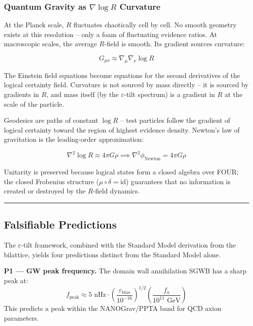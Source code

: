 \hypertarget{quantum-gravity-as-nabla-log-r-curvature}{%
\subsubsection{\texorpdfstring{Quantum Gravity as \(\nabla \log R\)
Curvature}{Quantum Gravity as \textbackslash nabla \textbackslash log R Curvature}}\label{quantum-gravity-as-nabla-log-r-curvature}}

At the Planck scale, \(R\) fluctuates chaotically cell by cell. No
smooth geometry exists at this resolution -- only a foam of fluctuating
evidence ratios. At macroscopic scales, the average \(R\)-field is
smooth. Its gradient sources curvature:

\[G_{\mu\nu} \approx \nabla_\mu \nabla_\nu \log R\]

The Einstein field equations become equations for the second derivatives
of the logical certainty field. Curvature is not sourced by mass
directly -- it is sourced by gradients in \(R\), and mass itself (by the
\(\varepsilon\)-tilt spectrum) is a gradient in \(R\) at the scale of
the particle.

Geodesics are paths of constant \(\log R\) -- test particles follow the
gradient of logical certainty toward the region of highest evidence
density. Newton's law of gravitation is the leading-order approximation:

\[\nabla^2 \log R \approx 4\pi G \rho \implies \nabla^2 \phi_\text{Newton} = 4\pi G \rho\]

Unitarity is preserved because logical states form a closed algebra over
FOUR; the closed Frobenius structure
(\(\mu \circ \delta = \mathrm{id}\)) guarantees that no information is
created or destroyed by the \(R\)-field dynamics.

\begin{center}\rule{0.5\linewidth}{0.5pt}\end{center}

\hypertarget{falsifiable-predictions}{%
\subsection{Falsifiable Predictions}\label{falsifiable-predictions}}

The \(\varepsilon\)-tilt framework, combined with the Standard Model
derivation from the bilattice, yields four predictions distinct from the
Standard Model alone.

\textbf{P1 --- GW peak frequency.} The domain wall annihilation SGWB has
a sharp peak at:
\[f_\text{peak} \approx 5 \text{ nHz} \cdot \left(\frac{\varepsilon_\text{bias}}{10^{-16}}\right)^{1/2} \left(\frac{f_a}{10^{11}\text{ GeV}}\right)\]
This predicts a peak within the NANOGrav/PPTA band for QCD axion
parameters.

